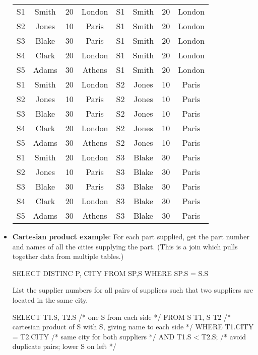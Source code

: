 \documentclass{report}
\begin{document}
\begin{itemize}
\begin{center}
\begin{tabular}{c|c|c|c|c|c|c|c}
                \hline
                S1 &Smith &20 &London &S1 &Smith& 20 &London \\
                S2 &Jones &10 &Paris &S1 &Smith &20 &London \\
                S3 &Blake &30 &Paris &S1 &Smith &20 &London \\
                S4 &Clark &20 &London &S1 &Smith &20& London \\
                S5 &Adams &30 &Athens &S1 &Smith &20& London \\
                S1 &Smith &20 &London &S2 &Jones &10& Paris \\
                S2 &Jones &10 &Paris &S2 &Jones &10 &Paris \\
                S3 &Blake &30 &Paris &S2 &Jones &10 &Paris \\
                S4 &Clark &20 &London &S2& Jones &10& Paris \\
                S5 &Adams &30 &Athens &S2& Jones &10& Paris \\
                S1 &Smith &20 &London &S3& Blake &30& Paris \\
                S2 &Jones &10 &Paris &S3 &Blake &30 &Paris \\
                S3 &Blake &30 &Paris &S3 &Blake &30 &Paris \\
                S4 &Clark &20 &London &S3& Blake &30 &Paris \\
                S5 &Adams &30 &Athens &S3& Blake &30 &Paris 
            \end{tabular}
        \end{center}
    \item \textbf{Cartesian product example}: For each part supplied, get the part number and names of all the cities supplying the part. (This is a join which pulls together data from multiple tables.)
        \bigbreak \noindent 
        \begin{sqlcode}
        SELECT DISTINC P, CITY
            FROM SP,S
            WHERE SP.S = S.S
        \end{sqlcode}
        \bigbreak \noindent 
        List the supplier numbers for all pairs of suppliers such that two suppliers are located in the same city.
        \bigbreak \noindent 
        \begin{sqlcode}
            SELECT T1.S, T2.S /* one S from each side */
                FROM S T1, S T2 /* cartesian product of S with S, giving name to each side */
                WHERE T1.CITY = T2.CITY /* same city for both suppliers */
                    AND T1.S < T2.S; /* avoid duplicate pairs; lower S on left */

\end{sqlcode}
\end{itemize}
\end{document}

